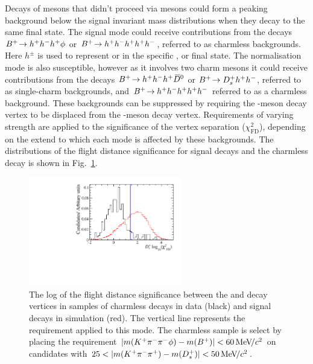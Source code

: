 Decays of \Bp mesons that didn't proceed via \D mesons could form a peaking background below the signal invariant mass distributions when they decay to the same final state.
The signal mode could receive contributions from the decays ${{{B}^+}}\!\rightarrow h^{+}h^{-}h^{+}\phi$ or ${{{B}^+}}\!\rightarrow h^{+}h^{-}h^{+}h^{+}h^{-}$, referred to as charmless backgrounds. Here $h^{\pm}$ is used to represent \Kpm or \pipm in the specific \Dsp, \Dzb or \phiz final state.
The normalisation mode is also susceptible, however as it involves two charm mesons it could receive contributions from the decays ${{{B}^+}}\!\rightarrow h^{+}h^{-}h^{+}{{\kern 0.2em\overline{\kern -0.2em D}{}}{}^0}$ or ${{{B}^+}}\!\rightarrow {\ensuremath{{D}^+_{s}}} h^{+}h^{-}$, referred to as single-charm backgrounds, and ${{{B}^+}}\!\rightarrow h^{+}h^{-}h^{+} h^{+}h^{-}$ referred to as a charmless background.
These backgrounds can be suppressed by requiring the \D-meson decay vertex to be displaced from the \Bp-meson decay vertex. Requirements of varying strength are applied to the significance of the vertex separation ($\chi^{2}_{\text{FD}}$), depending on the extend to which each mode is affected by these backgrounds. The distributions of the flight distance significance for \decay{\Bp}{(\decay{\Dsp}{\Kp\pim\pip})\phiz} signal decays and the charmless \decay{\Bp}{\Kp\pim\pip\phiz} decay is shown in Fig.~\ref{fig:Selection_FDCHI2}.

\begin{figure}[!h]
    \centering
        \includegraphics[width=0.6\textwidth]{figs/Selection/Charmless_Comparison_B2DsPhi_Ds2KPiPi_log10_D_FDCHI2_ORIVX.pdf}
        \caption{The log of the flight distance significance between the \Bp and \Dsp decay vertices in samples of charmless \decay{\Bp}{\Kp\pim\pip\phiz} decays in data (black) and \decay{\Bp}{(\decay{\Dsp}{\Kp\pim\pip})\phiz} signal decays in simulation (red). The vertical line represents the requirement applied to this mode. The charmless \decay{\Bp}{\Kp\pim\pip\phiz} sample is select by placing the requirement $|m({{K}^+}{{\pi}^-}{{\pi}^-}\phi)-m({{{B}^+}})|<60{\mathrm{\,Me\kern -0.1em V\!/}c^2}$ on \decay{\Bp}{(\decay{\Dsp}{\Kp\pim\pip})\phiz} candidates with $25 < |m({{K}^+}{{\pi}^-}{{\pi}^+}) - m({{D}^+_{s}})| < 50{\mathrm{\,Me\kern -0.1em V\!/}c^2} $.}
    \label{fig:Selection_FDCHI2}   
\end{figure}

